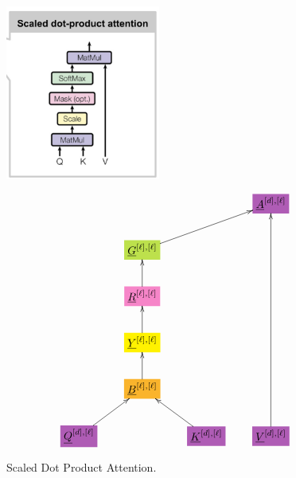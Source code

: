\documentclass[12pt]{article}
\begin{document}
\begin{figure}[h!]\centering
\begin{minipage}{.5\linewidth}
\includegraphics[width=2in]{scaled-dot-prod-att.jpg}
\end{minipage}%
\begin{minipage}{.5\linewidth}
$$\xymatrix{
&&&*+[F*:Orchid]{\underline{A}^{[d], [\ell]}}
\\
&*+[F*:SpringGreen]{\underline{G}^{[\ell], [\ell]}}\ar[urr]&&
\\
&*+[F*:Lavender]{\underline{R}^{[\ell], [\ell]}}\ar[u]&&
\\
&*+[F*:yellow]{\underline{Y}^{[\ell],[\ell]}}\ar[u]&&
\\
&*+[F*:Dandelion]{\underline{B}^{[\ell], [\ell]}}\ar[u]&&
\\
*+[F*:Orchid]{\underline{Q}^{[d],[\ell]}}\ar[ur]&&*+[F*:Orchid]{\underline{K}^{[d],[\ell]}}\ar[ul]&*+[F*:Orchid]{\underline{V}^{[d],[\ell]}}\ar[uuuuu]
}$$
\end{minipage}
\caption{Scaled Dot Product Attention.}
\label{fig-texnn-for-scaled-dot-prod-att}
\end{figure}
\end{document}

